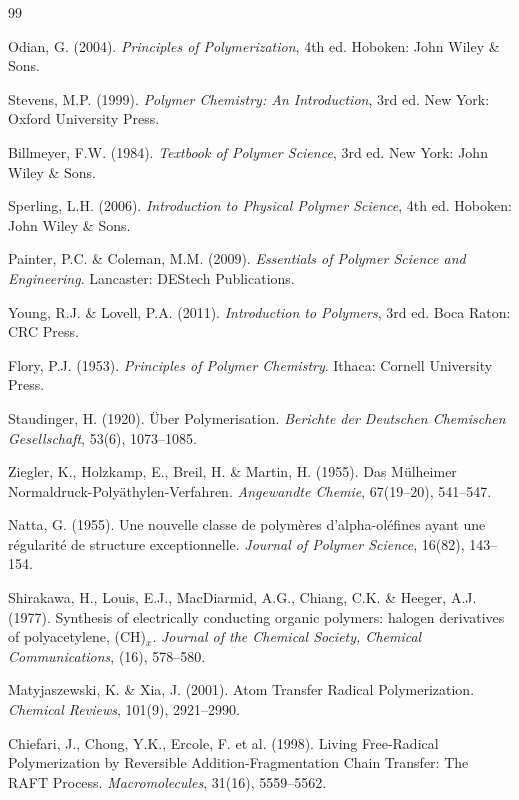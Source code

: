 \documentclass[12pt,a4paper,openany]{book}
\begin{document}
\begin{thebibliography}{99}

 Odian, G. (2004). \textit{Principles of Polymerization}, 4th ed. Hoboken: John Wiley \& Sons.

 Stevens, M.P. (1999). \textit{Polymer Chemistry: An Introduction}, 3rd ed. New York: Oxford University Press.

 Billmeyer, F.W. (1984). \textit{Textbook of Polymer Science}, 3rd ed. New York: John Wiley \& Sons.

 Sperling, L.H. (2006). \textit{Introduction to Physical Polymer Science}, 4th ed. Hoboken: John Wiley \& Sons.

 Painter, P.C. \& Coleman, M.M. (2009). \textit{Essentials of Polymer Science and Engineering}. Lancaster: DEStech Publications.

 Young, R.J. \& Lovell, P.A. (2011). \textit{Introduction to Polymers}, 3rd ed. Boca Raton: CRC Press.

 Flory, P.J. (1953). \textit{Principles of Polymer Chemistry}. Ithaca: Cornell University Press.

 Staudinger, H. (1920). \"{U}ber Polymerisation. \textit{Berichte der Deutschen Chemischen Gesellschaft}, 53(6), 1073--1085.

 Ziegler, K., Holzkamp, E., Breil, H. \& Martin, H. (1955). Das M\"{u}lheimer Normaldruck-Poly\"{a}thylen-Verfahren. \textit{Angewandte Chemie}, 67(19--20), 541--547.

 Natta, G. (1955). Une nouvelle classe de polym\`eres d'alpha-ol\'efines ayant une r\'egularit\'e de structure exceptionnelle. \textit{Journal of Polymer Science}, 16(82), 143--154.

 Shirakawa, H., Louis, E.J., MacDiarmid, A.G., Chiang, C.K. \& Heeger, A.J. (1977). Synthesis of electrically conducting organic polymers: halogen derivatives of polyacetylene, (CH)$_x$. \textit{Journal of the Chemical Society, Chemical Communications}, (16), 578--580.

 Matyjaszewski, K. \& Xia, J. (2001). Atom Transfer Radical Polymerization. \textit{Chemical Reviews}, 101(9), 2921--2990.

 Chiefari, J., Chong, Y.K., Ercole, F. et al. (1998). Living Free-Radical Polymerization by Reversible Addition-Fragmentation Chain Transfer: The RAFT Process. \textit{Macromolecules}, 31(16), 5559--5562.


\end{thebibliography}
\end{document}
